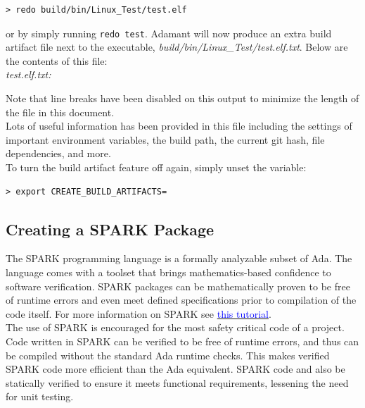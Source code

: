 \vspace{5mm} %
\begin{verbatim}
> redo build/bin/Linux_Test/test.elf
\end{verbatim}
\vspace{5mm} %

or by simply running \texttt{redo test}. Adamant will now produce an extra build artifact file next to the executable, \textit{build/bin/Linux\_Test/test.elf.txt}. Below are the contents of this file: \\

\textit{test.elf.txt:}

Note that line breaks have been disabled on this output to minimize the length of the file in this document. \\

Lots of useful information has been provided in this file including the settings of important environment variables, the build path, the current git hash, file dependencies, and more.  \\

To turn the build artifact feature off again, simply unset the variable:

\vspace{5mm} %
\begin{verbatim}
> export CREATE_BUILD_ARTIFACTS=
\end{verbatim}
\vspace{5mm} %

\subsection{Creating a SPARK Package} \label{Creating a SPARK Package}

The SPARK programming language is a formally analyzable subset of Ada. The language comes with a toolset that brings mathematics-based confidence to software verification. SPARK packages can be mathematically proven to be free of runtime errors and even meet defined specifications prior to compilation of the code itself. For more information on SPARK see \href{https://learn.adacore.com/courses/intro-to-spark/index.html}{\textcolor{blue}{this tutorial}}. \\ 

The use of SPARK is encouraged for the most safety critical code of a project. Code written in SPARK can be verified to be free of runtime errors, and thus can be compiled without the standard Ada runtime checks. This makes verified SPARK code more efficient than the Ada equivalent. SPARK code and also be statically verified to ensure it meets functional requirements, lessening the need for unit testing. \\

